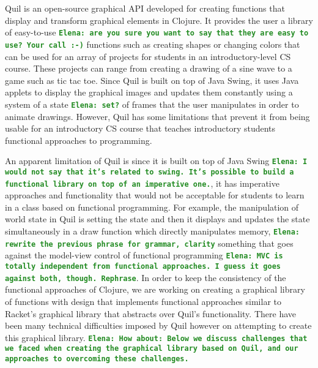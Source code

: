 \documentclass[12pt]{article}
\newcommand{\comment}[1]{{\bf \tt  {#1}}}
\newcommand{\emcomment}[1]{\textcolor{ForestGreen}{\comment{Elena: {#1}}}}
\begin{document}
Quil is an open-source graphical API developed for creating functions that display and transform graphical elements in Clojure. It provides the user a library of easy-to-use \emcomment{are you sure you want to say that they are easy to use? Your call :-)} functions such as creating shapes or changing colors that can be used for an array of projects for students in an introductory-level CS course. These projects can range from creating a drawing of a sine wave to a game such as tic tac toe. Since Quil is built on top of Java Swing, it uses Java applets to display the graphical images and updates them constantly using a system of a state \emcomment{set?} of frames that the user manipulates in order to animate drawings. However, Quil has some limitations that prevent it from being usable for an introductory CS course that teaches introductory students functional approaches to programming.

An apparent limitation of Quil is since it is built on top of Java Swing \emcomment{I would not say that it's related to swing. It's possible to build a functional library on top of an imperative one.}, it has imperative approaches and functionality that would not be acceptable for students to learn in a class based on functional programming. For example, the manipulation of world state in Quil is setting the state and then it displays and updates the state simultaneously in a draw function which directly manipulates memory, \emcomment{rewrite the previous phrase for grammar, clarity} something that goes against the model-view control of functional programming \emcomment{MVC is totally independent from functional approaches. I guess it goes against both, though. Rephrase}. In order to keep the consistency of the functional approaches of Clojure, we are working on creating a graphical library of functions with design that implements functional approaches similar to Racket’s graphical library that 
abstracts over Quil’s functionality. 
There have been many technical difficulties imposed by Quil however on attempting to create this graphical library.
\emcomment{How about: Below we discuss challenges that we faced when creating the graphical library based on Quil, and our approaches to overcoming these challenges.}
\end{document}
